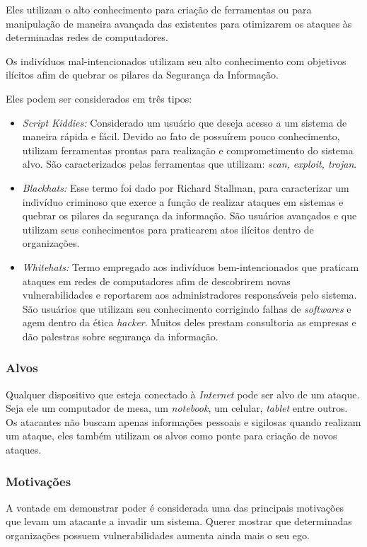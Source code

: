 Eles utilizam o alto conhecimento para criação de ferramentas ou para manipulação de maneira avançada das existentes para otimizarem os ataques às determinadas redes de computadores. 

Os indivíduos mal-intencionados utilizam seu alto conhecimento com objetivos ilícitos afim de quebrar os pilares da Segurança da Informação.

Eles podem ser considerados em três tipos:

\begin{itemize}
\item \textit{Script Kiddies:} Considerado um usuário que deseja acesso a um sistema de maneira rápida e fácil. Devido ao fato de possuírem pouco conhecimento, utilizam ferramentas prontas para realização e comprometimento do sistema alvo. São caracterizados pelas ferramentas que utilizam: \textit{scan, exploit, trojan}.

\item \textit{Blackhats:} Esse termo foi dado por Richard Stallman, para caracterizar um indivíduo criminoso que exerce a função de realizar ataques em sistemas e quebrar os pilares da segurança da informação. São usuários avançados e que utilizam seus conhecimentos para praticarem atos ilícitos dentro de organizações.

\item \textit{Whitehats:} Termo empregado aos indivíduos bem-intencionados que praticam ataques em redes de computadores afim de descobrirem novas vulnerabilidades e reportarem aos administradores responsáveis pelo sistema. São usuários que utilizam seu conhecimento corrigindo falhas de \textit{softwares} e agem dentro da ética \textit{hacker}. Muitos deles prestam consultoria as empresas e dão palestras sobre segurança da informação.
\end{itemize}

\subsubsection{Alvos}
Qualquer dispositivo que esteja conectado à \textit{Internet} pode ser alvo de um ataque. Seja ele um computador de mesa, um \textit{notebook}, um celular, \textit{tablet} entre outros. Os atacantes não buscam apenas informações pessoais e sigilosas quando realizam um ataque, eles também utilizam os alvos como ponte para criação de novos ataques.

\subsubsection{Motivações}
A vontade em demonstrar poder é considerada uma das principais motivações que levam um atacante a invadir um sistema. Querer mostrar que determinadas organizações possuem vulnerabilidades aumenta ainda mais o seu ego.

